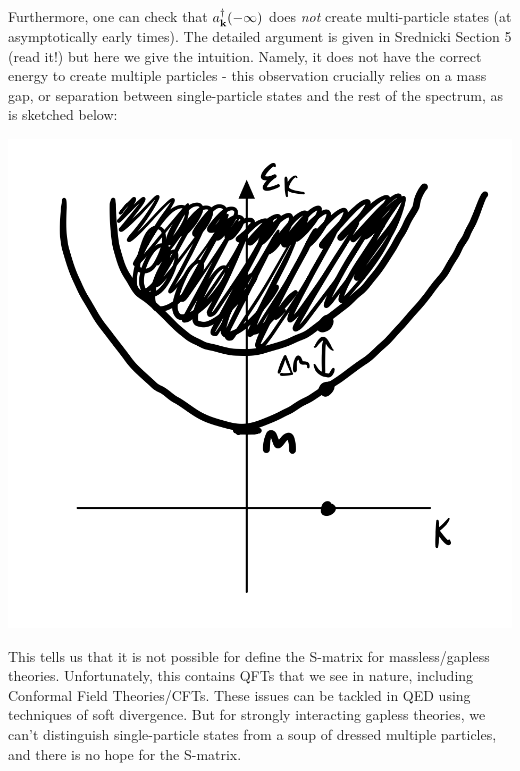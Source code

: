 Furthermore, one can check that $a^\dagger_{\mathbf{k}}(-\infty)$ does \emph{not} create multi-particle states (at asymptotically early times). The detailed argument is given in Srednicki Section 5 (read it!) but here we give the intuition. Namely, it does not have the correct energy to create multiple particles - this observation crucially relies on a mass gap, or separation between single-particle states and the rest of the spectrum, as is sketched below:

\begin{center}
    \includegraphics[scale=0.3]{Lectures/Figures/lec16-massgap.png}
\end{center}

This tells us that it is not possible for define the S-matrix for massless/gapless theories. Unfortunately, this contains QFTs that we see in nature, including Conformal Field Theories/CFTs. These issues can be tackled in QED using techniques of soft divergence. But for strongly interacting gapless theories, we can't distinguish single-particle states from a soup of dressed multiple particles, and there is no hope for the S-matrix.